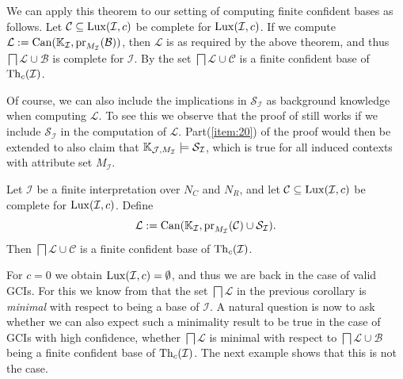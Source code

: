 We can apply this theorem to our setting of computing finite confident bases as follows.
Let $\mathcal{C} \subseteq \operatorname{Lux}(\mathcal{I}, c)$ be complete for $\operatorname{Lux}(\mathcal{I}, c)$.
If we compute $\mathcal{L} := \operatorname{Can}({\mathbb{K}}_{\mathcal{I}},
\operatorname{pr}_{M_{\mathcal{I}}}(\mathcal{B}))$, then $\mathcal{L}$ is as required by the above
theorem, and thus $\bigsqcap \mathcal{L} \cup \mathcal{B}$ is complete for $\mathcal{I}$.
By  the set $\bigsqcap \mathcal{L} \cup
\mathcal{C}$ is a finite confident base of $\operatorname{Th}_c(\mathcal{I})$.

Of course, we can also include the implications in $\mathcal{S}_{\mathcal{I}}$ as
background knowledge when computing $\mathcal{L}$.  To see this we observe that the proof
of  still works if we include
$\mathcal{S}_{\mathcal{I}}$ in the computation of $\mathcal{L}$.  Part(\ref{item:20}) of
the proof would then be extended to also claim that ${\mathbb{K}}_{\mathcal{J}, M_{\mathcal{I}}}
\models \mathcal{S}_{\mathcal{I}}$, which is true for all induced contexts with attribute
set $M_{\mathcal{I}}$.

\begin{Corollary}
  \label{cor:gci-completion-with-S_I}
  Let $\mathcal{I}$ be a finite interpretation over $N_C$ and $N_R$, and let $\mathcal{C}
  \subseteq \operatorname{Lux}(\mathcal{I}, c)$ be complete for $\operatorname{Lux}(\mathcal{I}, c)$.  Define
  \begin{equation*}
    \mathcal{L} := \operatorname{Can}({\mathbb{K}}_{\mathcal{I}}, \operatorname{pr}_{M_{\mathcal{I}}}(\mathcal{C}) \cup \mathcal{S}_{\mathcal{I}}).
  \end{equation*}
  Then $\bigsqcap \mathcal{L} \cup \mathcal{C}$ is a finite confident base of
  $\operatorname{Th}_c(\mathcal{I})$.
\end{Corollary}

For $c = 0$ we obtain $\operatorname{Lux}(\mathcal{I}, c) = \emptyset$, and thus we are back in the case
of valid GCIs.  For this we know from  that the set $\bigsqcap
\mathcal{L}$ in the previous corollary is \emph{minimal} with respect to being a base of
$\mathcal{I}$.  A natural question is now to ask whether we can also expect such a
minimality result to be true in the case of GCIs with high confidence, \ie whether
$\bigsqcap \mathcal{L}$ is minimal with respect to $\bigsqcap \mathcal{L} \cup
\mathcal{B}$ being a finite confident base of $\operatorname{Th}_c(\mathcal{I})$.  The next example
shows that this is not the case.


